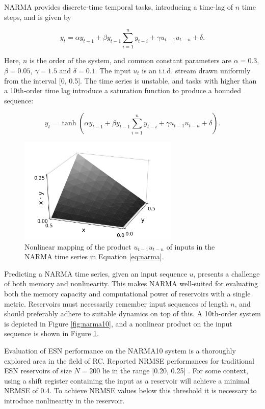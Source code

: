 NARMA provides discrete-time temporal tasks, introducing a time-lag of $n$ time
steps, and is given by

\begin{equation}
  y_{t} = \alpha y_{t-1} +
  \beta y_{t-1} \sum_{i=1}^{n}y_{t-i} +
  \gamma u_{t-1}u_{t-n} +
  \delta
  .
  \label{eq:narma}
\end{equation}

Here, $n$ is the order of the system, and common constant parameters are $\alpha
= 0.3$, $\beta = 0.05$, $\gamma = 1.5$ and $\delta = 0.1$. The input $u_{t}$ is
an i.i.d. stream drawn uniformly from the interval [0, 0.5]. The time series is
unstable, and tasks with higher than a 10th-order time lag introduce a
saturation function to produce a bounded sequence:

\begin{equation}
  y_{t} =
  \tanh(
  \alpha y_{t-1} +
  \beta y_{t-1} \sum_{i=1}^{n}y_{t-i} +
  \gamma u_{t-1}u_{t-n} +
  \delta
  )
  .
  \label{eq:narma-tanh}
\end{equation}

\begin{figure}[t!]
  \centering
  \includegraphics[width=3.0in]{figures/NARMA-nonlinearity.png}
  \caption{
    Nonlinear mapping of the product $u_{t-1}u_{t-n}$ of inputs in the NARMA
time series in Equation \protect\ref{eq:narma}.
  }
  \label{fig:narma-nonlinearity}
\end{figure}

Predicting a NARMA time series, given an input sequence $u$, presents a
challenge of both memory and nonlinearity. This makes NARMA well-suited for
evaluating both the memory capacity and computational power of reservoirs with a
single metric. Reservoirs must necessarily remember input sequences of length
$n$, and should preferably adhere to suitable dynamics on top of this. A
10th-order system is depicted in Figure \ref{fig:narma10}, and a nonlinear
product on the input sequence is shown in Figure \ref{fig:narma-nonlinearity}.

Evaluation of ESN performance on the NARMA10 system is a thoroughly explored
area in the field of RC. Reported NRMSE performances for traditional ESN
reservoirs of size $N = 200$ lie in the range [0.20, 0.25]
\cite{verstraeten_experimental_2007, rodan_minimum_2011,
goudarzi_comparative_2014, jaeger_adaptive_2003}. For some context, using a
shift register containing the input as a reservoir will achieve a minimal NRMSE
of 0.4. To achieve NRMSE values below this threshold it is necessary to
introduce nonlinearity in the reservoir.

